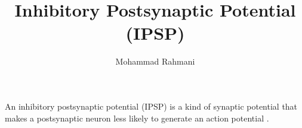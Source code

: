 \documentclass[a4paper]{article}
\title{Inhibitory Postsynaptic Potential (IPSP)}
\date{}
\author{Mohammad Rahmani}
\begin{document}
\maketitle
    An inhibitory postsynaptic potential (IPSP) is a kind of synaptic potential that makes a postsynaptic neuron less likely to generate an action potential .
    
    
\end{document}
